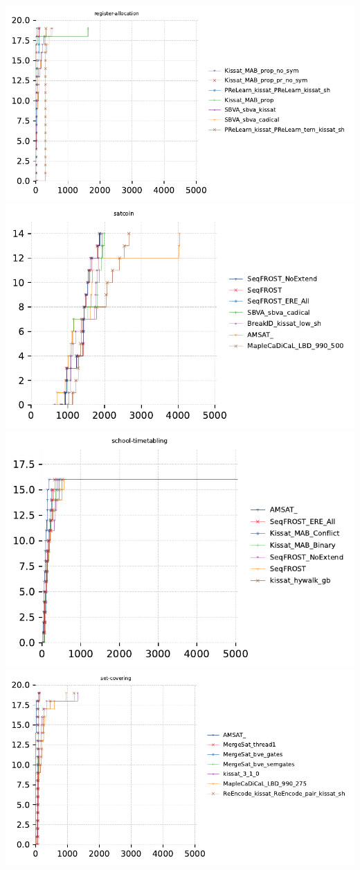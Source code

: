 \documentclass{article}
\begin{document}
\includegraphics[width=\linewidth]{gen/sc2023/cdfs/cdf-register-allocation.pdf}
\includegraphics[width=\linewidth]{gen/sc2023/cdfs/cdf-satcoin.pdf}
\includegraphics[width=\linewidth]{gen/sc2023/cdfs/cdf-school-timetabling.pdf}
\includegraphics[width=\linewidth]{gen/sc2023/cdfs/cdf-set-covering.pdf}
\end{document}
